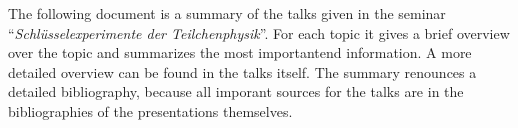 The following document is a summary of the talks given in the seminar \enquote{\textit{Schlüsselexperimente der Teilchenphysik}}. For each topic it gives a brief overview over the topic and summarizes the most importantend information. A more detailed overview can be found in the talks itself. The summary renounces a detailed bibliography, because all imporant sources for the talks are in the bibliographies of the presentations themselves.
